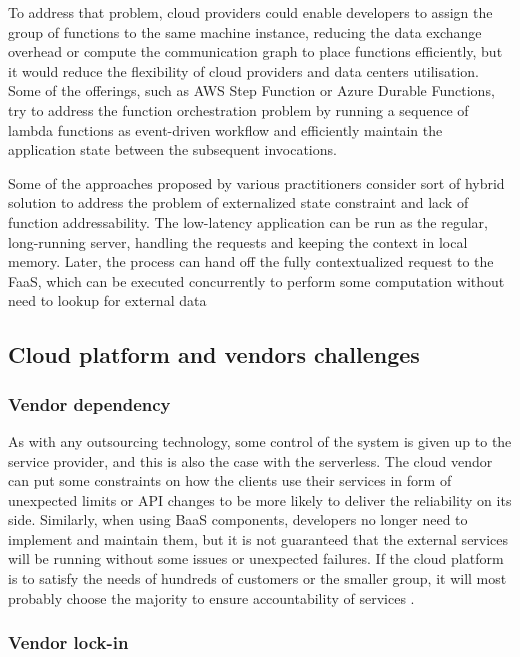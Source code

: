 To address that problem, cloud providers could enable developers to assign the group of functions to the same machine instance, reducing the data exchange overhead or compute the communication graph to place functions efficiently, but it would reduce the flexibility of cloud providers and data centers utilisation. Some of the offerings, such as AWS Step Function or Azure Durable Functions, try to address the function orchestration problem by running a sequence of lambda functions as event-driven workflow and efficiently maintain the application state between the subsequent invocations.

Some of the approaches proposed by various practitioners consider sort of hybrid solution to address the problem of externalized state constraint and lack of function addressability. The low-latency application can be run as the regular, long-running server, handling the requests and keeping the context in local memory. Later, the process can hand off the fully contextualized request to the FaaS, which can be executed concurrently to perform some computation without need to lookup for external data

\subsection{Cloud platform and vendors challenges}

\subsubsection*{Vendor dependency}

As with any outsourcing technology, some control of the system is given up to the service provider, and this is also the case with the serverless. The cloud vendor can put some constraints on how the clients use their services in form of unexpected limits or API changes to be more likely to deliver the reliability on its side. Similarly, when using BaaS components, developers no longer need to implement and maintain them, but it is not guaranteed that the external services will be running without some issues or unexpected failures. If the cloud platform is to satisfy the needs of hundreds of customers or the smaller group, it will most probably choose the majority to ensure accountability of services \cite{MartinFowlerServerless}.

\subsubsection*{Vendor lock-in}

